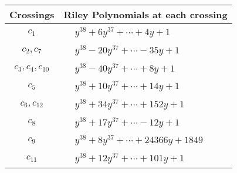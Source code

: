 \documentclass[1p]{elsarticle_modified}
\theoremstyle{definition}
\begin{document}
\begin{tabular}{m{50pt}|m{274pt}}
Crossings & \hspace{64pt}Riley Polynomials at each crossing \\
\hline $$\begin{aligned}c_{1}\end{aligned}$$&$\begin{aligned}
&y^{38}+6 y^{37}+\cdots+4 y+1
\end{aligned}$\\
\hline $$\begin{aligned}c_{2},c_{7}\end{aligned}$$&$\begin{aligned}
&y^{38}-20 y^{37}+\cdots-35 y+1
\end{aligned}$\\
\hline $$\begin{aligned}c_{3},c_{4},c_{10}\end{aligned}$$&$\begin{aligned}
&y^{38}-40 y^{37}+\cdots+8 y+1
\end{aligned}$\\
\hline $$\begin{aligned}c_{5}\end{aligned}$$&$\begin{aligned}
&y^{38}+10 y^{37}+\cdots+14 y+1
\end{aligned}$\\
\hline $$\begin{aligned}c_{6},c_{12}\end{aligned}$$&$\begin{aligned}
&y^{38}+34 y^{37}+\cdots+152 y+1
\end{aligned}$\\
\hline $$\begin{aligned}c_{8}\end{aligned}$$&$\begin{aligned}
&y^{38}+17 y^{37}+\cdots-12 y+1
\end{aligned}$\\
\hline $$\begin{aligned}c_{9}\end{aligned}$$&$\begin{aligned}
&y^{38}+8 y^{37}+\cdots+24366 y+1849
\end{aligned}$\\
\hline $$\begin{aligned}c_{11}\end{aligned}$$&$\begin{aligned}
&y^{38}+12 y^{37}+\cdots+101 y+1
\end{aligned}$\\
\hline
\end{tabular}\\~\\
\end{document}
